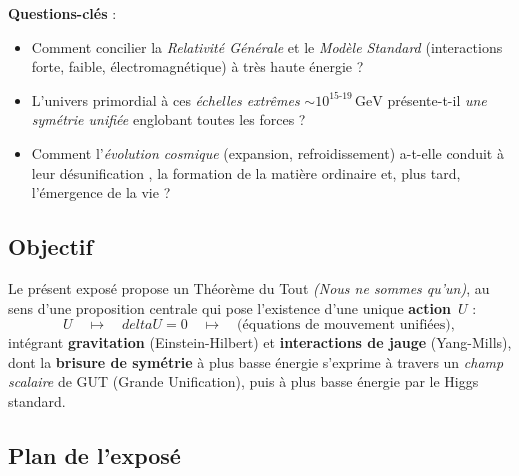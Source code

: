 \documentclass[12pt]{article}
\def\delta{delta}%
\begin{document}
\medskip

\noindent
\textbf{Questions-cl\'es} :
\begin{itemize}
    \item Comment concilier la \emph{Relativit\'e G\'en\'erale} et le \emph{Mod\`ele Standard} 
          (interactions forte, faible, \'electromagn\'etique) \`a tr\`es haute \'energie ?
    \item L'univers primordial \`a ces \emph{\'echelles extr\^emes} \(\sim 10^{15\text{-}19}\,\mathrm{GeV}\) 
          pr\'esente-t-il \emph{une sym\'etrie unifi\'ee} englobant toutes les forces ?
    \item Comment l'\emph{\'evolution cosmique} (expansion, refroidissement) a-t-elle 
          conduit \`a leur \og d\'esunification \fg{}, la formation de la mati\`ere ordinaire 
          et, plus tard, l'\'emergence de la vie ?
\end{itemize}

\subsection{Objectif}

Le pr\'esent expos\'e propose un \og Th\'eor\`eme du Tout \fg{} \emph{(Nous ne sommes qu'un)}, 
au sens d'une proposition centrale qui pose l'existence d'une unique \textbf{action} \(\,U\) : 
\[
U \quad\longmapsto\quad \delta U = 0 \quad \longmapsto\quad
\text{(\'equations de mouvement unifi\'ees)},
\]
int\'egrant \textbf{gravitation} (Einstein-Hilbert) et \textbf{interactions de jauge} (Yang-Mills), 
dont la \textbf{brisure de sym\'etrie} \`a plus basse \'energie s'exprime \`a travers 
un \textit{champ scalaire} de GUT (Grande Unification), puis \`a plus basse \'energie 
par le Higgs standard.

\subsection{Plan de l'expos\'e}
\end{document}
